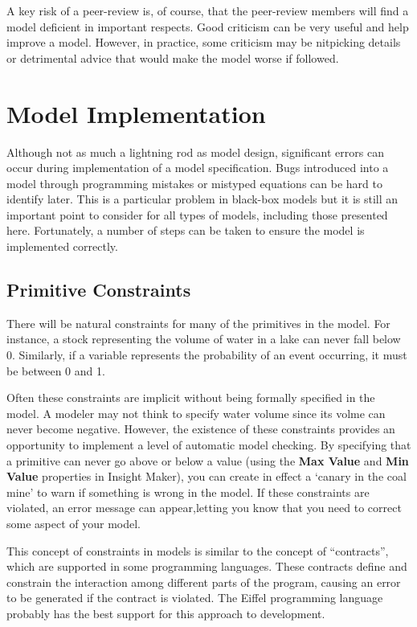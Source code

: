 \documentclass[]{memoir}
\renewcommand{\a}[1]{\textbf{#1}}
\begin{document}
A key risk of a peer-review is, of course, that the peer-review members
will find a model deficient in important respects. Good criticism can be
very useful and help improve a model. However, in practice, some
criticism may be nitpicking details or detrimental advice that would
make the model worse if followed.

\section{Model Implementation}

Although not as much a lightning rod as model design, significant errors
can occur during implementation of a model specification. Bugs
introduced into a model through programming mistakes or mistyped
equations can be hard to identify later. This is a particular problem in
black-box models but it is still an important point to consider for all
types of models, including those presented here. Fortunately, a number
of steps can be taken to ensure the model is implemented correctly.

\subsection{Primitive Constraints}

There will be natural constraints for many of the primitives in the
model. For instance, a stock representing the volume of water in a lake
can never fall below 0. Similarly, if a variable represents the
probability of an event occurring, it must be between 0 and 1.

Often these constraints are implicit without being formally specified in
the model. A modeler may not think to specify water volume since its
volme can never become negative. However, the existence of these
constraints provides an opportunity to implement a level of automatic
model checking. By specifying that a primitive can never go above or
below a value (using the \a{Max Value} and \a{Min Value} properties in
Insight Maker), you can create in effect a `canary in the coal mine' to
warn if something is wrong in the model. If these constraints are
violated, an error message can appear,letting you know that you need to
correct some aspect of your model.

This concept of constraints in models is similar to the concept of
``contracts'', which are supported in some programming languages. These
contracts define and constrain the interaction among different parts of
the program, causing an error to be generated if the contract is
violated. The Eiffel programming language probably has the best support
for this approach to development.
\end{document}
